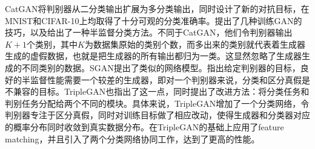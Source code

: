 
%

CatGAN\cite{springenberg2015unsupervised}将判别器从二分类输出扩展为多分类输出，同时设计了新的对抗目标，在MNIST\cite{lecun1989backpropagation}和CIFAR-10\cite{krizhevsky2009learning}上均取得了十分可观的分类准确率。\citet{salimans2016improved}提出了几种训练GAN的技巧，以及给出了一种半监督分类方法。不同于CatGAN，他们令判别器输出$K+1$个类别，其中$K$为数据集原始的类别个数，而多出来的类别就代表着生成器生成的虚假数据，也就是把生成器的所有输出都归为一类。这显然忽略了生成器生成的不同类别的数据。SGAN\cite{odena2016semi}提出了类似的网络模型。\citet{dai2017good}指出给定判别器的目标，良好的半监督性能需要一个较差的生成器，即对一个判别器来说，分类和区分真假是不兼容的目标。TripleGAN\cite{chongxuan2017triple}也指出了这一点，同时提出了改进方法：将分类任务和判别任务分配给两个不同的模块。具体来说，TripleGAN增加了一个分类网络，令判别器专注于区分真假，同时对训练目标做了相应改动，使得生成器和分类器对应的概率分布同时收敛到真实数据分布。\citet{wu2019enhancing}在TripleGAN的基础上应用了feature matching\cite{salimans2016improved}，并且引入了两个分类网络协同工作，达到了更高的性能。



